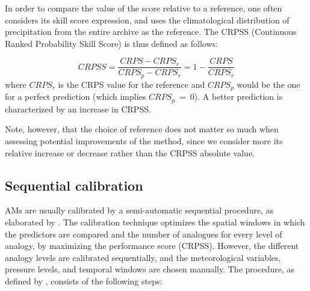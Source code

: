 \documentclass[review]{elsarticle}
\begin{document}
In order to compare the value of the score relative to a reference, one often considers its skill score expression, and uses the climatological distribution of precipitation from the entire archive as the reference. The CRPSS (Continuous Ranked Probability Skill Score) is thus defined as follows:

\begin{equation}
\label{eq:CRPSS}
CRPSS = \frac{CRPS-CRPS_{r}}{CRPS_{p}-CRPS_{r}} = 1-\frac{CRPS}{CRPS_{r}}
\end{equation}
where $CRPS_{r}$ is the CRPS value for the reference and $CRPS_{p}$ would be the one for a perfect prediction (which implies $CRPS_{p}~=~0$). A better prediction is characterized by an increase in CRPSS.

Note, however, that the choice of reference does not matter so much when assessing potential improvements of the method, since we consider more its relative increase or decrease rather than the CRPSS absolute value.

\subsection{Sequential calibration}
\label{sec:sequential}

AMs are usually calibrated by a semi-automatic sequential procedure, as elaborated by \citet{Bontron2004} \cite[see also ][]{Radanovics2013, BenDaoud2016}. The calibration technique optimizes the spatial windows in which the predictors are compared and the number of analogues for every level of analogy, by maximizing the performance score (CRPSS). However, the different analogy levels are calibrated sequentially, and the meteorological variables, pressure levels, and temporal windows are chosen manually. The procedure, as defined by \citet{Bontron2004}, consists of the following steps:
\end{document}
